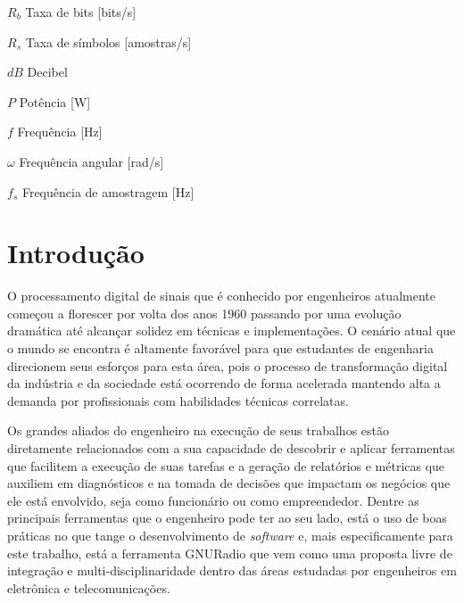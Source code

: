 \documentclass[
  12pt,				%
  openright,			%
  twoside,			%
  a4paper,			%
  english,			%
  french,				%
  spanish,			%
  brazil,				%
  ]{abntex2}
\begin{document}
\begin{simbolos}
  \item[$ R_b $] Taxa de bits [bits/s]
  \item[$ R_s $] Taxa de símbolos [amostras/s]
  \item[$ dB $] Decibel
  \item[$ P $] Potência [W]
  \item[$f$] Frequência [Hz]
  \item[$\omega$] Frequência angular [rad/s]
  \item[$f_s$] Frequência de amostragem [Hz]
\end{simbolos}

\tableofcontents*
\cleardoublepage

\textual

\chapter*[Introdução]{Introdução}

O processamento digital de sinais que é conhecido por engenheiros atualmente começou a florescer por volta dos anos 1960 \cite{hayes:1999} passando por uma evolução
dramática até alcançar solidez em técnicas e implementações. O cenário atual que o mundo se encontra é altamente favorável para que estudantes de engenharia
direcionem seus esforços para esta área, pois o processo de transformação digital da indústria e da sociedade está ocorrendo de forma acelerada
\cite{ebert:digital_transformation} mantendo alta a demanda por profissionais com habilidades técnicas correlatas.

Os grandes aliados do engenheiro na execução de seus trabalhos estão diretamente relacionados com a sua capacidade de descobrir e aplicar ferramentas que facilitem a execução de suas
tarefas e a geração de relatórios e métricas que auxiliem em diagnósticos e na tomada de decisões que impactam os negócios que ele está envolvido, seja como funcionário ou como empreendedor.
Dentre as principais ferramentas que o engenheiro pode ter ao seu lado, está o uso de boas práticas no que tange o desenvolvimento de \textit{software} e, mais especificamente para este trabalho,
está a ferramenta GNURadio que vem como uma proposta livre de integração e multi-disciplinaridade dentro das áreas estudadas por engenheiros em eletrônica e telecomunicações.
\end{document}
